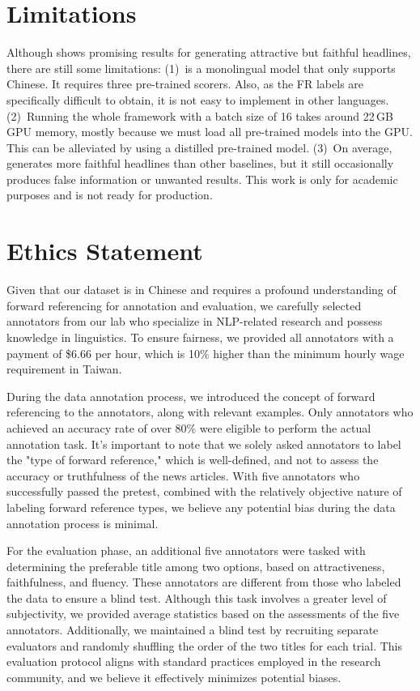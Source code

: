 \section*{Limitations}
Although \modelname shows promising results for generating attractive but faithful headlines, there are still
some limitations: (1)~\modelname is a monolingual model that only
supports Chinese. It requires three pre-trained scorers. Also, as the FR labels are
specifically difficult to obtain, it is not easy to implement in
other languages. (2)~Running the whole framework with a batch size of 16
takes around 22\,GB GPU memory, mostly because we must load all pre-trained
models into the GPU. This can be alleviated by using a distilled pre-trained model. (3)~On average, \modelname generates more faithful
headlines than other baselines, but it still occasionally produces false
information or unwanted results. This work is only for academic purposes and is
not ready for production.

\section*{Ethics Statement}
Given that our dataset is in Chinese and requires a profound understanding of forward referencing for annotation and evaluation, we carefully selected annotators from our lab who specialize in NLP-related research and possess knowledge in linguistics. To ensure fairness, we provided all annotators with a payment of \$6.66 per hour, which is 10\% higher than the minimum hourly wage requirement in Taiwan.

During the data annotation process, we introduced the concept of forward referencing to the annotators, along with relevant examples. Only annotators who achieved an accuracy rate of over 80\% were eligible to perform the actual annotation task. It's important to note that we solely asked annotators to label the "type of forward reference," which is well-defined, and not to assess the accuracy or truthfulness of the news articles. With five annotators who successfully passed the pretest, combined with the relatively objective nature of labeling forward reference types, we believe any potential bias during the data annotation process is minimal.

For the evaluation phase, an additional five annotators were tasked with determining the preferable title among two options, based on attractiveness, faithfulness, and fluency. These annotators are different from those who labeled the data to ensure a blind test. Although this task involves a greater level of subjectivity, we provided average statistics based on the assessments of the five annotators. Additionally, we maintained a blind test by recruiting separate evaluators and randomly shuffling the order of the two titles for each trial. This evaluation protocol aligns with standard practices employed in the research community, and we believe it effectively minimizes potential biases.

